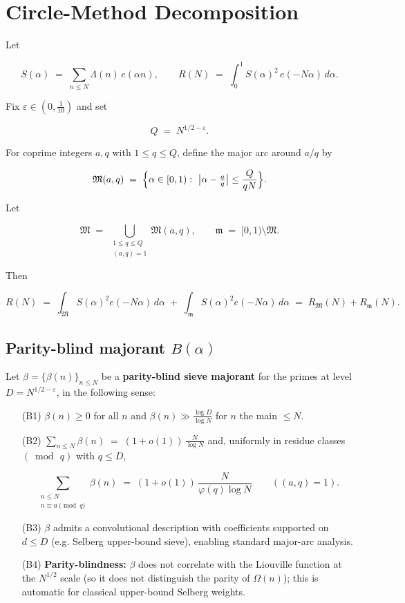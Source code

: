 \documentclass[11pt]{article}
\theoremstyle{definition}
\theoremstyle{remark}
\numberwithin{equation}{part}
\begin{document}
\section{Circle-Method Decomposition}

Let

$$
	S(\alpha)\;=\;\sum_{n\le N}\Lambda(n)\,e(\alpha n),\qquad
	R(N)\;=\;\int_{0}^{1} S(\alpha)^2\,e(-N\alpha)\,d\alpha .
$$

Fix $\varepsilon\in (0,\tfrac1{10})$ and set

$$
	Q \;=\; N^{1/2-\varepsilon}.
$$

For coprime integers $a,q$ with $1\le q\le Q$, define the major arc around $a/q$ by

$$
	\mathfrak M(a,q)\;=\;\Bigl\{\alpha\in[0,1):\ \bigl|\alpha-\tfrac{a}{q}\bigr|
	\le \frac{Q}{qN}\Bigr\}.
$$

Let

$$
	\mathfrak M\;=\;\bigcup_{\substack{1\le q\le Q\\ (a,q)=1}}\mathfrak M(a,q),
	\qquad
	\mathfrak m\;=\;[0,1)\setminus\mathfrak M .
$$

Then

$$
	R(N)\;=\;\int_{\mathfrak M} S(\alpha)^2 e(-N\alpha)\,d\alpha\;+\;
	\int_{\mathfrak m} S(\alpha)^2 e(-N\alpha)\,d\alpha
	\;=\;R_{\mathfrak M}(N)+R_{\mathfrak m}(N).
$$


\subsection*{Parity-blind majorant \texorpdfstring{$B(\alpha)$}{B\textalpha}}

Let $\beta=\{\beta(n)\}_{n\le N}$ be a \textbf{parity-blind sieve majorant} for the primes at level $D=N^{1/2-\varepsilon}$, in the following sense:

\begin{itemize}[leftmargin=*]
	\item[(B1)] $\beta(n)\ge 0$ for all $n$ and $\beta(n)\gg \tfrac{\log D}{\log N}$ for $n$ the main $\le N$.
	\item[(B2)] $\displaystyle \sum_{n\le N}\beta(n)\;=\;(1+o(1))\,\frac{N}{\log N}$ and, uniformly in residue classes $(\bmod\,q)$ with $q\le D$,

	      $$
		      \sum_{\substack{n\le N\\ n\equiv a\!\!\!\pmod q}}\beta(n)
		      \;=\;(1+o(1))\,\frac{N}{\varphi(q)\log N}\qquad ((a,q)=1).
	      $$

	\item[(B3)] $\beta$ admits a convolutional description with coefficients supported on $d\le D$ (e.g. Selberg upper-bound sieve), enabling standard major-arc analysis.
	\item[(B4)] \textbf{Parity-blindness:} $\beta$ does not correlate with the Liouville function at the $N^{1/2}$ scale (so it does not distinguish the parity of $\Omega(n)$); this is automatic for classical upper-bound Selberg weights.
\end{itemize}
\end{document}
